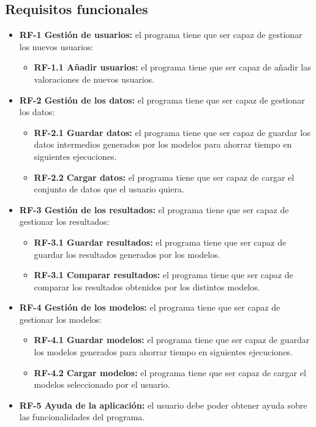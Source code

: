 \subsection{Requisitos funcionales}
\begin{itemize}
\tightlist
\item \textbf{RF-1 Gestión de usuarios:} el programa tiene que ser capaz de gestionar los nuevos usuarios:
\begin{itemize}
\tightlist
\item \textbf{RF-1.1 Añadir usuarios:} el programa tiene que ser capaz de añadir las valoraciones de nuevos usuarios.
\end{itemize}
\item \textbf{RF-2 Gestión de los datos:} el programa tiene que ser capaz de gestionar los datos:
\begin{itemize}
\tightlist
\item \textbf{RF-2.1 Guardar datos:} el programa tiene que ser capaz de guardar los datos intermedios generados por los modelos para ahorrar tiempo en siguientes ejecuciones.
\item \textbf{RF-2.2 Cargar datos:} el programa tiene que ser capaz de cargar el conjunto de datos que el usuario quiera.
\end{itemize}
\item \textbf{RF-3 Gestión de los resultados:} el programa tiene que ser capaz de gestionar los resultados:
\begin{itemize}
\tightlist
\item \textbf{RF-3.1 Guardar resultados:} el programa tiene que ser capaz de guardar los resultados generados por los modelos.
\item \textbf{RF-3.1 Comparar resultados:} el programa tiene que ser capaz de comparar los resultados obtenidos por los distintos modelos.
\end{itemize}
\item \textbf{RF-4 Gestión de los modelos:} el programa tiene que ser capaz de gestionar los modelos:
\begin{itemize}
\tightlist
\item \textbf{RF-4.1 Guardar modelos:} el programa tiene que ser capaz de guardar los modelos generados para ahorrar tiempo en siguientes ejecuciones.
\item \textbf{RF-4.2 Cargar modelos:} el programa tiene que ser capaz de cargar el modelos seleccionado por el usuario.
\end{itemize}
\item \textbf{RF-5 Ayuda de la aplicación:} el usuario debe poder obtener ayuda sobre las funcionalidades del programa.
\end{itemize}

